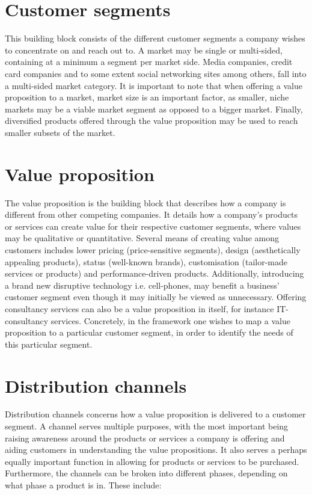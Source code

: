 \section{Customer segments}
This building block consists of the different customer segments a company wishes to concentrate on and reach out to. A market may be single or multi-sided, containing at a minimum a segment per market side. Media companies, credit card companies and to some extent social networking sites among others, fall into a multi-sided market category. It is important to note that when offering a value proposition to a market, market size is an important factor, as smaller, niche markets may be a viable market segment as opposed to a bigger market. Finally, diversified products offered through the value proposition may be used to reach smaller subsets of the market.

\section{Value proposition}
The value proposition is the building block that describes how a company is different from other competing companies. It details how a company's products or services can create value for their respective customer segments, where values may be qualitative or quantitative. Several means of creating value among customers  includes lower pricing (price-sensitive segments), design (aesthetically appealing products), status (well-known brands), customisation (tailor-made services or products) and performance-driven products. Additionally, introducing a brand new disruptive technology i.e. cell-phones, may benefit a business' customer segment even though it may initially be viewed as unnecessary. Offering consultancy services can also be a value proposition in itself, for instance IT-consultancy services. Concretely, in the framework one wishes to map a value proposition to a particular customer segment, in order to identify the needs of this particular segment.

\section{Distribution channels}
Distribution channels concerns how a value proposition is delivered to a customer segment. A channel serves multiple purposes, with the most important being raising awareness around the products or services a company is offering and aiding customers in understanding the value propositions. It also serves a perhaps equally important function in allowing for products or services to be purchased. Furthermore, the channels can be broken into different phases, depending on what phase a product is in. These include:

